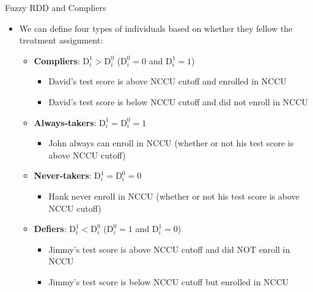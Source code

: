 \documentclass[hyperref={pdfpagelabels=false}]{beamer}
\begin{document}
\begin{frame}{Fuzzy RDD and Compliers}
	\begin{itemize}
		
		\item We can define four types of individuals based on whether they fellow the treatment assignment:
		\vspace{0.2cm}
		\begin{itemize}
			\vspace{0.3cm}
			\item \textbf{Compliers}: $\mathrm{D}^{1}_{i}>\mathrm{D}^{0}_{i}$ ($\mathrm{D}^{0}_{i}=0$ and $\mathrm{D}^{1}_{i}=1$)
			\begin{itemize}
				\item David's test score is above NCCU cutoff and enrolled in NCCU 
				\vspace{0.2cm}
				\item David's test score is below NCCU cutoff and did not enroll in NCCU 
			\end{itemize}
			\item \textbf{Always-takers}: $\mathrm{D}^{1}_{i}=\mathrm{D}^{0}_{i}=1$
			\begin{itemize}
				\item John always can enroll in NCCU (whether or not his test score is above NCCU cutoff)
				\vspace{0.2cm}
			\end{itemize}			
			\item \textbf{Never-takers}: $\mathrm{D}^{1}_{i}=\mathrm{D}^{0}_{i}=0$
			\begin{itemize}
				\item Hank never enroll in NCCU (whether or not his test score is above NCCU cutoff)
				\vspace{0.2cm}
			\end{itemize}			
			\item \textbf{Defiers}: $\mathrm{D}^{1}_{i}<\mathrm{D}^{0}_{i}$ ($\mathrm{D}^{0}_{i}=1$ and $\mathrm{D}^{1}_{i}=0$)
			\begin{itemize}
				\item Jimmy's test score is above NCCU cutoff and did NOT enroll in NCCU  
				\vspace{0.2cm}
				\item Jimmy's test score is below NCCU cutoff but enrolled in NCCU  
			\end{itemize}
			
			
		\end{itemize}
		
	\end{itemize}
\end{frame}
\end{document}
